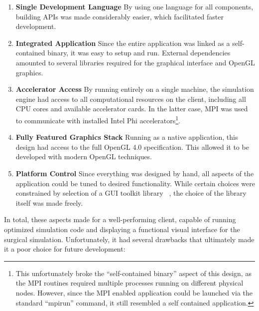 \begin{enumerate}
  \item \textbf{Single Development Language} By using one language for
    all components, building APIs was made considerably easier, which
    facilitated faster development.

  \item \textbf{Integrated Application} Since the entire application
    was linked as a self-contained binary, it was easy to setup and
    run. External dependencies amounted to several libraries required
    for the graphical interface and OpenGL graphics.

  \item \textbf{Accelerator Access} By running entirely on a single
    machine, the simulation engine had access to all computational
    resources on the client, including all CPU cores and available
    accelerator cards. In the latter case, MPI was used to communicate
    with installed Intel Phi accelerators\footnote{This unfortunately
      broke the ``self-contained binary'' aspect of this design, as
      the MPI routines required multiple processes running on
      different physical nodes. However, since the MPI enabled
      application could be launched via the standard ``mpirun'' command, it
      still resembled a self contained application.}. 

   \item \textbf{Fully Featured Graphics Stack} Running as a native
     application, this design had access to the full OpenGL 4.0
     specification. This allowed it to be developed with modern OpenGL
     techniques.

   \item \textbf{Platform Control} Since everything was designed by
     hand, all aspects of the application could be tuned to desired
     functionality. While certain choices were constrained by
     selection of a GUI toolkit library ~\citep{wxWid:2017}, the choice of the
     library itself was made freely.
    
\end{enumerate}

 In total, these aspects made for a well-performing client, capable of
 running optimized simulation code and displaying a functional visual
 interface for the surgical simulation. Unfortunately, it had several
 drawbacks that ultimately made it a poor choice for future
 development:

